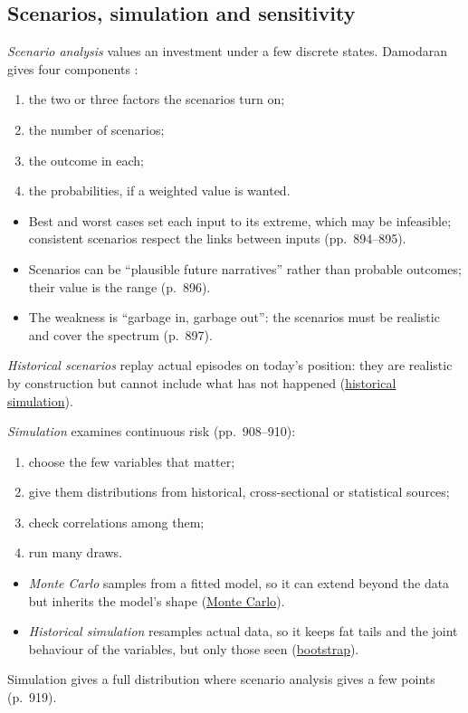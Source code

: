 \subsection{Scenarios, simulation and sensitivity}

\begin{qfmethod}\label{meth:scenario-simulation-analysis}
 \emph{Scenario analysis} values an investment under a few discrete states. Damodaran gives four components \citep[pp.~894--897]{investment-valuation-2012}:
\begin{enumerate}
\item the two or three factors the scenarios turn on;
\item the number of scenarios;
\item the outcome in each;
\item the probabilities, if a weighted value is wanted.
\end{enumerate}
\begin{itemize}
\item Best and worst cases set each input to its extreme, which may be infeasible; consistent scenarios respect the links between inputs (pp.~894--895).
\item Scenarios can be ``plausible future narratives'' rather than probable outcomes; their value is the range (p.~896).
\item The weakness is ``garbage in, garbage out'': the scenarios must be realistic and cover the spectrum (p.~897).
\end{itemize}
\emph{Historical scenarios} replay actual episodes on today's position: they are realistic by construction but cannot include what has not happened (\hyperref[meth:historical-simulation]{historical simulation}).

\emph{Simulation} examines continuous risk (pp.~908--910):
\begin{enumerate}
\item choose the few variables that matter;
\item give them distributions from historical, cross-sectional or statistical sources;
\item check correlations among them;
\item run many draws.
\end{enumerate}
\begin{itemize}
\item \emph{Monte Carlo} samples from a fitted model, so it can extend beyond the data but inherits the model's shape (\hyperref[meth:monte-carlo-simulation]{Monte Carlo}).
\item \emph{Historical simulation} resamples actual data, so it keeps fat tails and the joint behaviour of the variables, but only those seen (\hyperref[meth:bootstrap-resampling]{bootstrap}).
\end{itemize}
Simulation gives a full distribution where scenario analysis gives a few points (p.~919).


\end{qfmethod}
